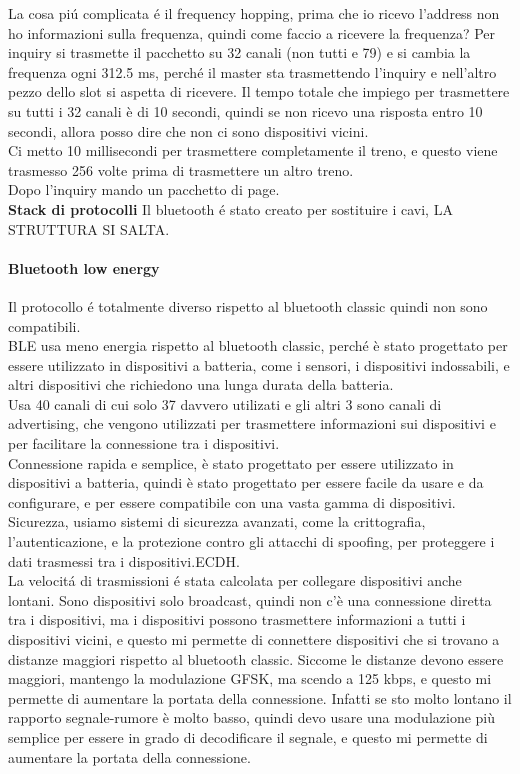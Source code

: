 La cosa piú complicata é il frequency hopping, prima che io ricevo l'address non ho informazioni sulla frequenza, quindi come faccio a ricevere la frequenza? 
Per inquiry si trasmette il pacchetto su 32 canali (non tutti e 79) e si cambia la frequenza ogni 312.5 ms, perché il master sta trasmettendo l'inquiry e nell'altro pezzo dello slot si aspetta di ricevere. Il tempo totale che impiego per trasmettere su tutti i 32 canali è di 10 secondi, quindi se non ricevo una risposta entro 10 secondi, allora posso dire che non ci sono dispositivi vicini.\\
Ci metto 10 millisecondi per trasmettere completamente il treno, e questo viene trasmesso 256 volte prima di trasmettere un altro treno.\\

Dopo l'inquiry mando un pacchetto di page.\\

\textbf{Stack di protocolli} Il bluetooth é stato creato per sostituire i cavi, LA STRUTTURA SI SALTA.

\paragraph{Bluetooth low energy}
Il protocollo é totalmente diverso rispetto al bluetooth classic quindi non sono compatibili.\\
BLE usa meno energia rispetto al bluetooth classic, perché è stato progettato per essere utilizzato in dispositivi a batteria, come i sensori, i dispositivi indossabili, e altri dispositivi che richiedono una lunga durata della batteria.\\
Usa 40 canali di cui solo 37 davvero utilizati e gli altri 3 sono canali di advertising, che vengono utilizzati per trasmettere informazioni sui dispositivi e per facilitare la connessione tra i dispositivi.\\
Connessione rapida e semplice, è stato progettato per essere utilizzato in dispositivi a batteria, quindi è stato progettato per essere facile da usare e da configurare, e per essere compatibile con una vasta gamma di dispositivi.\\
Sicurezza, usiamo sistemi di sicurezza avanzati, come la crittografia, l'autenticazione, e la protezione contro gli attacchi di spoofing, per proteggere i dati trasmessi tra i dispositivi.ECDH.\\
La velocitá di trasmissioni é stata calcolata per collegare dispositivi anche lontani. Sono dispositivi solo broadcast, quindi non c'è una connessione diretta tra i dispositivi, ma i dispositivi possono trasmettere informazioni a tutti i dispositivi vicini, e questo mi permette di connettere dispositivi che si trovano a distanze maggiori rispetto al bluetooth classic. Siccome le distanze devono essere maggiori, mantengo la modulazione GFSK, ma scendo a 125 kbps, e questo mi permette di aumentare la portata della connessione. Infatti se sto molto lontano il rapporto segnale-rumore è molto basso, quindi devo usare una modulazione più semplice per essere in grado di decodificare il segnale, e questo mi permette di aumentare la portata della connessione.\\

